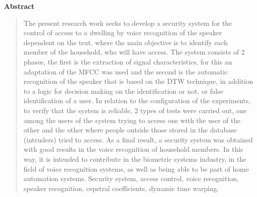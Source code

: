 \newpage
\begin{center}
 {\bf\LARGE Abstract}
\end{center} 
\begin{quotation}
The present research work seeks to develop a security system for the control of access to a dwelling by voice recognition of the speaker dependent on the text, where the main objective is to identify each member of the household, who will have access.
\vskip 0.1cm
The system consists of 2 phases, the first is the extraction of signal characteristics, for this an adaptation of the MFCC was used and the second is the automatic recognition of the speaker that is based on the DTW technique, in addition to a logic for decision making on the identification or not, or false identification of a user. In relation to the configuration of the experiments, to verify that the system is reliable, 2 types of tests were carried out, one among the users of the system trying to access one with the user of the other and the other where people outside those stored in the database (intruders) tried to access.
\vskip 0.1cm
As a final result, a security system was obtained with good results in the voice recognition of household members. In this way, it is intended to contribute in the biometric systems industry, in the field of voice recognition systems, as well as being able to be part of home automation systems.
\vskip 0.1cm
\hspace*{-0.6cm}{\bf Keywords:} 
Security system, access control, voice recognition, speaker recognition, cepstral coefficients, dynamic time warping.
\end{quotation}


